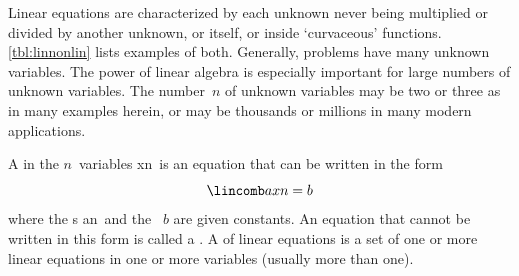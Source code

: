 Linear equations are characterized by each unknown never being multiplied or divided by another unknown, or itself, or inside `curvaceous' functions.  
\cref{tbl:linnonlin} lists examples of both.
Generally, problems have many unknown variables.
The power of linear algebra is especially important for large numbers of unknown variables.
The number~\(n\) of unknown variables may be two or three as in many examples herein, or may be thousands or millions in many modern applications.




\begin{definition} \label{def:lineqn} 
A  in the \(n\)~variables \hlist xn\ is an equation that can be written in the form
\begin{equation*}
\lincomb axn=b
\end{equation*}
where the s \hlist an\ and the ~\(b\) are given  constants.
An equation that cannot be written in this form is called a .
A  of linear equations is a set of one or more linear equations in one or more variables (usually more than one).
\end{definition}


